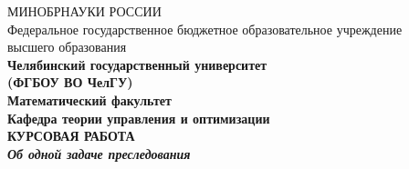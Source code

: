 \documentclass[12pt,a4paper,titlepage]{article}
\begin{document}
\begin{titlepage}
\begin{center}
  МИНОБРНАУКИ РОССИИ\\
  Федеральное государственное бюджетное образовательное учреждение\\ высшего образования\\

\bfseries \flqq Челябинский государственный университет\frqq \\
\bfseries (ФГБОУ ВО \flqq ЧелГУ\frqq) \\[0.7cm]

Математический факультет\\
Кафедра теории управления и оптимизации\\[3.4cm]
\large\bfseries КУРСОВАЯ РАБОТА\\[1cm]
\textit{\large\bfseries{Об одной задаче преследования\\[2cm]}}


\end{center}
\end{titlepage}
\end{document}

